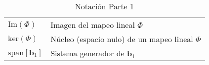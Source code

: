 \begin{table}[ht!]
\begin{center}
\begin{tabularx}{\textwidth}{|l|X|}
            $ \text{Im}\left(\Phi\right) $                    & Imagen del mapeo lineal $\Phi$                                                                                              \\
            $ \text{ker}\left(\Phi\right) $                   & Núcleo (espacio nulo) de un mapeo lineal $\Phi$                                                                             \\
            $ \text{span}\left[\mathbf{b}_{1}\right] $        & Sistema generador de $\mathbf{b}_{1}$                                                                                       \\


            \hline
        \end{tabularx}
        \caption{Notación Parte 1}
        \label{tab:nnotation-part-1}
    \end{center}
\end{table}


